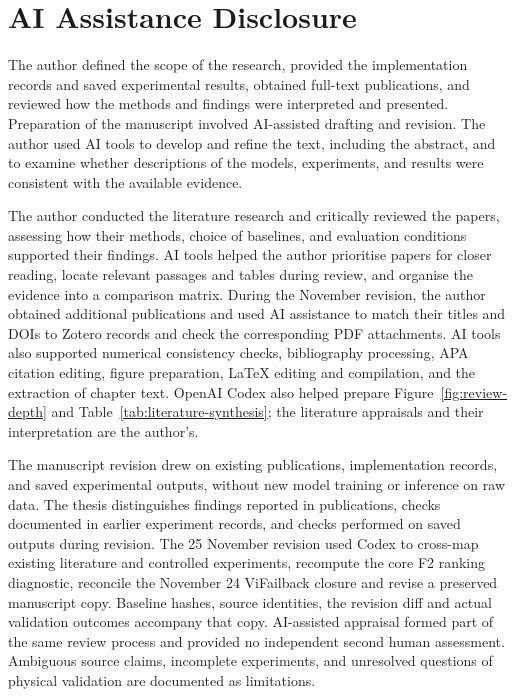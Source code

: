 \clearpage
\begingroup
\makeatletter
\renewcommand{\@makeschapterhead}[1]{%
  {\parindent=0pt\raggedright\normalfont\Huge\bfseries #1\par}%
  \nobreak\vspace{6pt}}
\makeatother
\chapter*{AI Assistance Disclosure}
\endgroup
\noindent
The author defined the scope of the research, provided the implementation records and
saved experimental results, obtained full-text publications, and reviewed how the
methods and findings were interpreted and presented. Preparation of the manuscript
involved AI-assisted drafting and revision. The author used AI tools to develop and
refine the text, including the abstract, and to examine whether descriptions of the
models, experiments, and results were consistent with the available evidence.

The author conducted the literature research and critically reviewed the papers,
assessing how their methods, choice of baselines, and evaluation conditions supported
their findings. AI tools helped the author prioritise papers for closer reading, locate
relevant passages and tables during review, and organise the evidence into a comparison
matrix. During the November revision, the author obtained additional publications and
used AI assistance to match their titles and DOIs to Zotero records and check the
corresponding PDF attachments. AI tools also supported numerical consistency checks,
bibliography processing, APA citation editing, figure preparation, LaTeX editing and
compilation, and the extraction of chapter text.
OpenAI Codex also helped prepare Figure~\ref{fig:review-depth} and
Table~\ref{tab:literature-synthesis}; the literature appraisals and their
interpretation are the author's.

The manuscript revision drew on existing publications, implementation records, and saved
experimental outputs, without new model training or inference on raw data. The thesis
distinguishes findings reported in publications, checks documented in earlier experiment
records, and checks performed on saved outputs during revision. The 25 November revision
used Codex to cross-map existing literature and controlled experiments, recompute the
core F2 ranking diagnostic, reconcile the November 24 ViFailback closure and revise a
preserved manuscript copy. Baseline hashes, source identities, the revision diff and
actual validation outcomes accompany that copy. AI-assisted appraisal formed part of the
same review process and provided no independent second human assessment. Ambiguous
source claims, incomplete experiments, and unresolved questions of physical validation
are documented as limitations.

